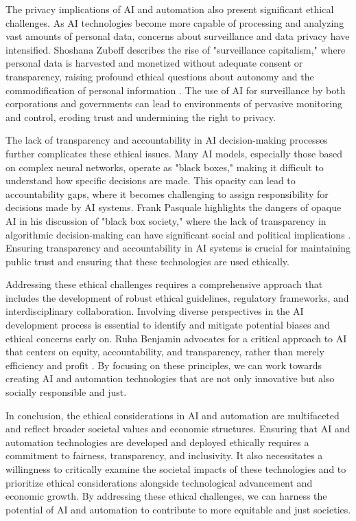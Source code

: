 \begin{refsection}
The privacy implications of AI and automation also present significant ethical challenges. As AI technologies become more capable of processing and analyzing vast amounts of personal data, concerns about surveillance and data privacy have intensified. Shoshana Zuboff describes the rise of "surveillance capitalism," where personal data is harvested and monetized without adequate consent or transparency, raising profound ethical questions about autonomy and the commodification of personal information \cite[pp.~104-107]{zuboff2020age}. The use of AI for surveillance by both corporations and governments can lead to environments of pervasive monitoring and control, eroding trust and undermining the right to privacy.

The lack of transparency and accountability in AI decision-making processes further complicates these ethical issues. Many AI models, especially those based on complex neural networks, operate as "black boxes," making it difficult to understand how specific decisions are made. This opacity can lead to accountability gaps, where it becomes challenging to assign responsibility for decisions made by AI systems. Frank Pasquale highlights the dangers of opaque AI in his discussion of "black box society," where the lack of transparency in algorithmic decision-making can have significant social and political implications \cite[pp.~145-148]{pasquale2015black}. Ensuring transparency and accountability in AI systems is crucial for maintaining public trust and ensuring that these technologies are used ethically.

Addressing these ethical challenges requires a comprehensive approach that includes the development of robust ethical guidelines, regulatory frameworks, and interdisciplinary collaboration. Involving diverse perspectives in the AI development process is essential to identify and mitigate potential biases and ethical concerns early on. Ruha Benjamin advocates for a critical approach to AI that centers on equity, accountability, and transparency, rather than merely efficiency and profit \cite[pp.~15-18]{benjamin2019race}. By focusing on these principles, we can work towards creating AI and automation technologies that are not only innovative but also socially responsible and just.

In conclusion, the ethical considerations in AI and automation are multifaceted and reflect broader societal values and economic structures. Ensuring that AI and automation technologies are developed and deployed ethically requires a commitment to fairness, transparency, and inclusivity. It also necessitates a willingness to critically examine the societal impacts of these technologies and to prioritize ethical considerations alongside technological advancement and economic growth. By addressing these ethical challenges, we can harness the potential of AI and automation to contribute to more equitable and just societies.


\end{refsection}
